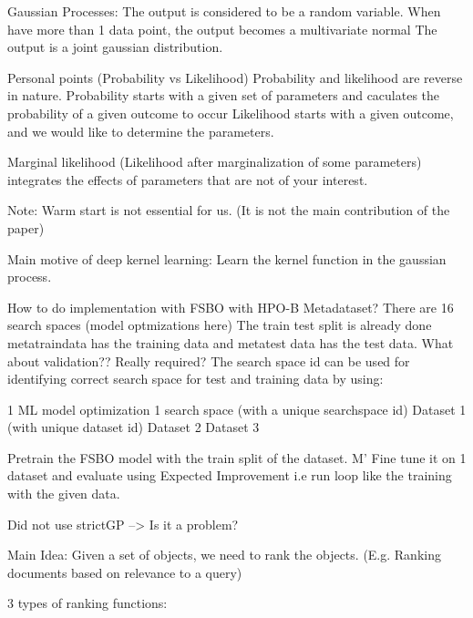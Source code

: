 \documentclass[12pt, twoside, ngerman]{report}
\begin{document}
Gaussian Processes:
    The output is considered to be a random variable.
    When have more than 1 data point, the output becomes a multivariate normal
        The output is a joint gaussian distribution.

Personal points (Probability vs Likelihood)
    Probability and likelihood are reverse in nature.
    Probability starts with a given set of parameters and caculates the probability of a given outcome to occur
    Likelihood starts with a given outcome, and we would like to determine the parameters.

    Marginal likelihood (Likelihood after marginalization of some parameters)
        integrates the effects of parameters that are not of your interest.

Note:
    Warm start is not essential for us. (It is not the main contribution of the paper)

Main motive of deep kernel learning:
    Learn the kernel function in the gaussian process.

How to do implementation with FSBO with HPO-B Metadataset?
There are 16 search spaces (model optmizations here)
    The train test split is already done metatraindata has the training data and metatest data has the test data.
    What about validation?? Really required?
    The search space id can be used for identifying correct search space for test and training data by using:

1 ML model optimization
    1 search space (with a unique searchspace id)
        Dataset 1 (with unique dataset id)
        Dataset 2
        Dataset 3

Pretrain the FSBO model with the train split of the dataset. M'
Fine tune it on 1 dataset and evaluate using Expected Improvement
    i.e run loop like the training with the given data.

Did not use strictGP --> Is it a problem?
\fi

\iffalse
Main Idea:
    Given a set of objects, we need to rank the objects. (E.g. Ranking documents based on relevance to a query)
    

3 types of ranking functions:
\end{document}
